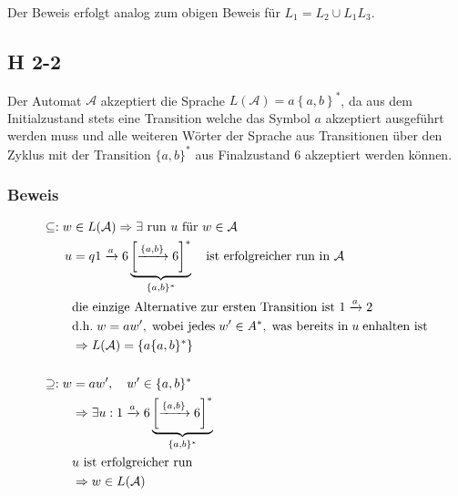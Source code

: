 \documentclass{scrartcl}
\begin{document}
Der Beweis erfolgt analog zum obigen Beweis für $L_1 = L_2 \cup L_1 L_3$.

\subsection{H 2-2}

Der Automat $\mathcal{A}$ akzeptiert die Sprache $L(\mathcal{A}) = a\left\{a,b\right\}^*$, da aus dem Initialzustand stets eine Transition welche das Symbol $a$ akzeptiert ausgeführt werden muss und alle weiteren Wörter der Sprache aus Transitionen über den Zyklus mit der Transition $\{a,b\}^*$ aus Finalzustand $6$ akzeptiert werden können.

\subsubsection{Beweis}

\begin{align*}
\subseteq: w &\in L(\mathcal{A}) \Rightarrow \exists \text{ run } u \text{ für } w \in \mathcal{A}\\
u   &= q1 \xrightarrow{a} 6 \underbrace{\left[\xrightarrow{\{a,b\}} 6 \right]^*}_{\{a,b\}^*}\quad\text{ist erfolgreicher run in }\mathcal{A}\\
    &\text{die einzige Alternative zur ersten Transition ist } 1\xrightarrow{a}2\\
    &\text{d.h.}\;w = aw',\;\text{wobei jedes}\;w'\in A^*,\;\text{was bereits in}\;u\;\text{enhalten ist}
\\
    &\Rightarrow L(\mathcal{A}) = \left\{ a\{a,b\}^* \right\}\\[\baselineskip]
\supseteq: w &= aw',\quad w' \in \{a,b\}^*\\
    &\Rightarrow \exists u: 1 \xrightarrow{a} 6 \underbrace{\left[\xrightarrow{\{a,b\}} 6 \right]^*}_{\{a,b\}^*}\\
    &u \text{ ist erfolgreicher run }\\
    &\Rightarrow w \in L(\mathcal{A})
\end{align*}
\end{document}
